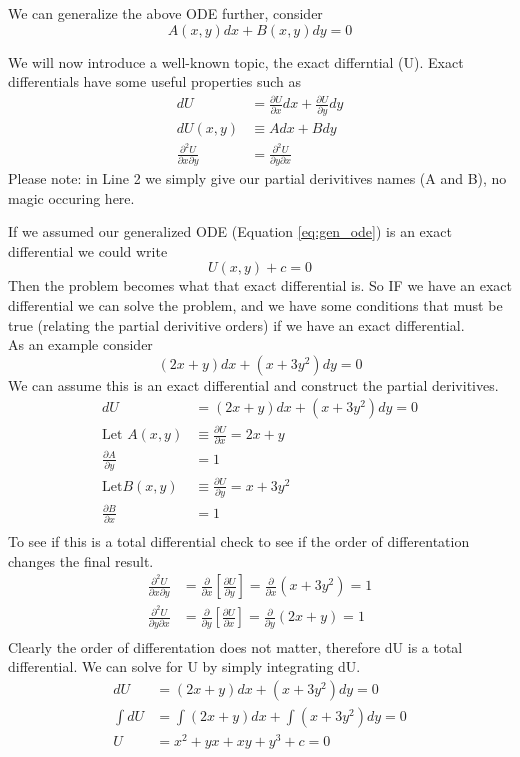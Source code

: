 \documentclass{article}
\newcommand{\be}{\begin{equation}}
\newcommand{\ee}{\end{equation}}
\newcommand{\pd}{\partial}
\begin{document}
We can generalize the above ODE further, consider
\be \label{eq:gen_ode}
A(x,y)dx + B(x,y)dy = 0
\ee

We will now introduce a well-known topic, the exact differntial (U). 
Exact differentials have some useful properties such as
\be
\begin{split}
    dU &= \frac{\pd U}{\pd x} dx + \frac{\pd U}{\pd y} dy \\
    dU(x,y) &\equiv A dx + B dy \\
    \frac{\pd ^2 U}{\pd x \pd y} &= \frac{\pd ^2 U}{\pd y \pd x}
\end{split}
\ee
Please note: in Line 2 we simply give our partial derivitives names (A and B), no magic occuring here. 

If we assumed our generalized ODE (Equation \ref{eq:gen_ode}) is an exact differential we could write 
\be
U(x,y) + c = 0
\ee
Then the problem becomes what that exact differential is.
So IF we have an exact differential we can solve the problem, and we have some conditions that must be true (relating the partial derivitive orders) if we have an exact differential.\\

As an example consider
\be
(2x+y)dx + (x+3y^2)dy = 0
\ee
We can assume this is an exact differential and construct the partial derivitives.
\be
\begin{split}
    dU & = (2x+y)dx + (x+3y^2)dy = 0\\
    \text{Let } A(x,y) &\equiv \frac{\partial U}{\partial x} = 2x+y  \\
\frac{\partial A}{\partial y} &= 1 \\
    \text{Let} B(x,y) &\equiv \frac{\partial U}{\partial y}  = x+ 3y^2  \\
\frac{\partial B}{\partial x} &= 1 \\
\end{split}
\ee
To see if this is a total differential check to see if the order of differentation changes the final result.
\be
\begin{split}
    \frac{\pd ^2 U}{\pd x \pd y} &= \frac{\pd }{\pd x}\left[\frac{\pd U}{\pd y}\right]= \frac{\pd}{\pd x}\left(x+3y^2\right) = 1 \\
    \frac{\pd ^2 U}{\pd y \pd x} &= \frac{\pd }{\pd y}\left[\frac{\pd U}{\pd x}\right]= \frac{\pd}{\pd y}\left(2x+y\right) = 1 \\
\end{split}
\ee
Clearly the order of differentation does not matter, therefore dU is a total differential.
We can solve for U by simply integrating dU. 
\be
\begin{split}
    dU & = (2x+y)dx + (x+3y^2)dy = 0\\
    \int dU & = \int (2x+y)dx + \int (x+3y^2)dy = 0\\
    U & = x^2 + yx + xy + y^3 + c = 0
\end{split}
\ee
\end{document}
